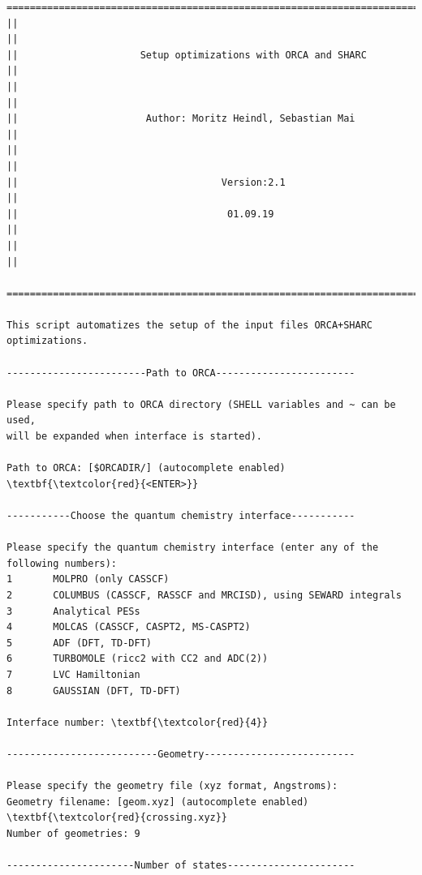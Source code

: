 \documentclass[a4paper,11pt,DIV=15,openany]{scrbook}
\begin{document}
\begin{oframed}
\footnotesize\begin{Verbatim}[commandchars=\\\{\}]
  ================================================================================
||                                                                                ||
||                     Setup optimizations with ORCA and SHARC                    ||
||                                                                                ||
||                      Author: Moritz Heindl, Sebastian Mai                      ||
||                                                                                ||
||                                   Version:2.1                                  ||
||                                    01.09.19                                    ||
||                                                                                ||
  ================================================================================

This script automatizes the setup of the input files ORCA+SHARC optimizations. 
  
------------------------Path to ORCA------------------------

Please specify path to ORCA directory (SHELL variables and ~ can be used, 
will be expanded when interface is started).

Path to ORCA: [$ORCADIR/] (autocomplete enabled) \textbf{\textcolor{red}{<ENTER>}}

-----------Choose the quantum chemistry interface-----------

Please specify the quantum chemistry interface (enter any of the following numbers):
1       MOLPRO (only CASSCF)
2       COLUMBUS (CASSCF, RASSCF and MRCISD), using SEWARD integrals
3       Analytical PESs
4       MOLCAS (CASSCF, CASPT2, MS-CASPT2)
5       ADF (DFT, TD-DFT)
6       TURBOMOLE (ricc2 with CC2 and ADC(2))
7       LVC Hamiltonian
8       GAUSSIAN (DFT, TD-DFT)

Interface number: \textbf{\textcolor{red}{4}}

--------------------------Geometry--------------------------

Please specify the geometry file (xyz format, Angstroms):
Geometry filename: [geom.xyz] (autocomplete enabled) \textbf{\textcolor{red}{crossing.xyz}}
Number of geometries: 9

----------------------Number of states----------------------



\end{Verbatim}
\end{oframed}
\end{document}
